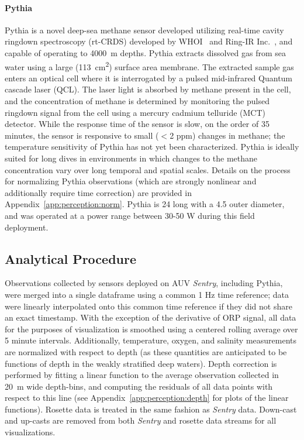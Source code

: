 \paragraph{Pythia}
\label{sec:nopp}
Pythia is a novel deep-sea methane sensor developed utilizing real-time cavity ringdown spectroscopy (rt-CRDS) developed by WHOI~\autocite{michel2022gas} and Ring-IR Inc.~\autocite{Harb:12}, and capable of operating to \SI{4000}{\meter} depths. Pythia extracts dissolved gas from sea water using a large (\SI{113}{\centi\meter\squared}) surface area membrane. The extracted sample gas enters an optical cell where it is interrogated by a pulsed mid-infrared Quantum cascade laser (QCL). The laser light is absorbed by methane present in the cell, and the concentration of methane is determined by monitoring the pulsed ringdown signal from the cell using a mercury cadmium telluride (MCT) detector. While the response time of the sensor is slow, on the order of 35 minutes, the sensor is responsive to small ($<$2 ppm) changes in methane; the temperature sensitivity of Pythia has not yet been characterized. Pythia is ideally suited for long dives in environments in which changes to the methane concentration vary over long temporal and spatial scales. Details on the process for normalizing Pythia observations (which are strongly nonlinear and additionally require time correction) are provided in Appendix~\ref{app:perception:norm}. Pythia is \SI{24}{\inch} long with a \SI{4.5}{\inch} outer diameter, and was operated at a power range between 30-50 W during this field deployment.

\subsection{Analytical Procedure}
\label{sec:analytical}
Observations collected by sensors deployed on AUV \emph{Sentry}, including Pythia, were merged into a single dataframe using a common 1 Hz time reference; data were linearly interpolated onto this common time reference if they did not share an exact timestamp. With the exception of the derivative of ORP signal, all data for the purposes of visualization is smoothed using a centered rolling average over 5 minute intervals. Additionally, temperature, oxygen, and salinity measurements are normalized with respect to depth (as these quantities are anticipated to be functions of depth in the weakly stratified deep waters). Depth correction is performed by fitting a linear function to the average observation collected in \SI{20}{\meter} wide depth-bins, and computing the residuals of all data points with respect to this line (see Appendix~\ref{app:perception:depth} for plots of the linear functions). Rosette data is treated in the same fashion as \emph{Sentry} data. Down-cast and up-casts are removed from both \emph{Sentry} and rosette data streams for all visualizations.


